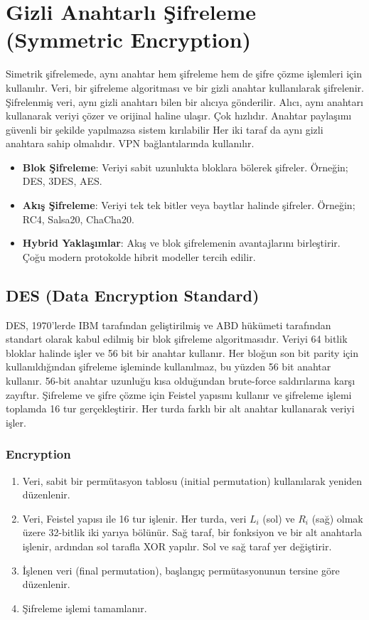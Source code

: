 \section{Gizli Anahtarlı Şifreleme (Symmetric Encryption)}

Simetrik şifrelemede, aynı anahtar hem şifreleme hem de şifre çözme işlemleri için kullanılır. Veri, bir şifreleme algoritması ve bir gizli anahtar kullanılarak şifrelenir. Şifrelenmiş veri, aynı gizli anahtarı bilen bir alıcıya gönderilir. Alıcı, aynı anahtarı kullanarak veriyi çözer ve orijinal haline ulaşır. Çok hızlıdır. Anahtar paylaşımı güvenli bir şekilde yapılmazsa sistem kırılabilir Her iki taraf da aynı gizli anahtara sahip olmalıdır. VPN bağlantılarında kullanılır. 

\begin{itemize}
    \item \textbf{Blok Şifreleme}: Veriyi sabit uzunlukta bloklara bölerek şifreler. Örneğin; DES, 3DES, AES.
    \item \textbf{Akış Şifreleme}: Veriyi tek tek bitler veya baytlar halinde şifreler. Örneğin; RC4, Salsa20, ChaCha20.
    \item \textbf{Hybrid Yaklaşımlar}: Akış ve blok şifrelemenin avantajlarını birleştirir. Çoğu modern protokolde hibrit modeller tercih edilir.
\end{itemize}

\subsection{DES (Data Encryption Standard)}

DES, 1970'lerde IBM tarafından geliştirilmiş ve ABD hükümeti tarafından standart olarak kabul edilmiş bir blok şifreleme algoritmasıdır. Veriyi 64 bitlik bloklar halinde işler ve 56 bit bir anahtar kullanır. Her bloğun son bit parity için kullanıldığından şifreleme işleminde kullanılmaz, bu yüzden 56 bit anahtar kullanır. 56-bit anahtar uzunluğu kısa olduğundan brute-force saldırılarına karşı zayıftır. Şifreleme ve şifre çözme için Feistel yapısını kullanır ve şifreleme işlemi toplamda 16 tur gerçekleştirir. Her turda farklı bir alt anahtar kullanarak veriyi işler. 

\subsubsection{Encryption}

\begin{enumerate}
    \item Veri, sabit bir permütasyon tablosu (initial permutation) kullanılarak yeniden düzenlenir.
    \item Veri, Feistel yapısı ile 16 tur işlenir. Her turda, veri $L_i$ (sol) ve $R_i$ (sağ) olmak üzere 32-bitlik iki yarıya bölünür. Sağ taraf, bir fonksiyon ve bir alt anahtarla işlenir, ardından sol tarafla XOR yapılır. Sol ve sağ taraf yer değiştirir.
    \item İşlenen veri (final permutation), başlangıç permütasyonunun tersine göre düzenlenir.
    \item Şifreleme işlemi tamamlanır.
\end{enumerate}

